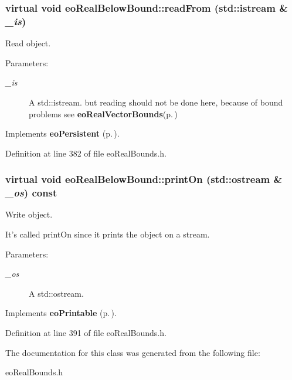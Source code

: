 \subsubsection{\setlength{\rightskip}{0pt plus 5cm}virtual void eo\-Real\-Below\-Bound::read\-From (std::istream \& {\em \_\-is})\hspace{0.3cm}{\tt  [inline, virtual]}}\label{classeo_real_below_bound_a13}


Read object. 

\begin{Desc}
\item[Parameters:]
\begin{description}
\item[{\em \_\-is}]A std::istream. but reading should not be done here, because of bound problems see {\bf eo\-Real\-Vector\-Bounds}{\rm (p.\,\pageref{classeo_real_vector_bounds})} \end{description}
\end{Desc}


Implements {\bf eo\-Persistent} {\rm (p.\,\pageref{classeo_persistent_a1})}.

Definition at line 382 of file eo\-Real\-Bounds.h.
\subsubsection{\setlength{\rightskip}{0pt plus 5cm}virtual void eo\-Real\-Below\-Bound::print\-On (std::ostream \& {\em \_\-os}) const\hspace{0.3cm}{\tt  [inline, virtual]}}\label{classeo_real_below_bound_a14}


Write object. 

It's called print\-On since it prints the object on a stream. \begin{Desc}
\item[Parameters:]
\begin{description}
\item[{\em \_\-os}]A std::ostream. \end{description}
\end{Desc}


Implements {\bf eo\-Printable} {\rm (p.\,\pageref{classeo_printable_a1})}.

Definition at line 391 of file eo\-Real\-Bounds.h.

The documentation for this class was generated from the following file:\begin{CompactItemize}
\item 
eo\-Real\-Bounds.h\end{CompactItemize}
